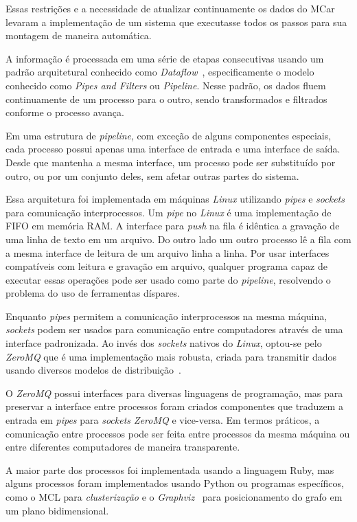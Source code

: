 \documentclass[12pt,a4paper]{article}
\begin{document}
Essas restrições e a necessidade de atualizar continuamente os dados do MCar levaram a implementação de um sistema que executasse todos os passos para sua montagem de maneira automática.

A informação é processada em uma série de etapas consecutivas usando um padrão arquitetural conhecido como \textit{Dataflow}~\cite{Carkci2014-jk, Hohpe2003-nj}, especificamente o modelo conhecido como \textit{Pipes and Filters} ou \textit{Pipeline}. Nesse padrão, os dados fluem continuamente de um processo para o outro, sendo transformados e filtrados conforme o processo avança. 

Em uma estrutura de \textit{pipeline}, com exceção de alguns componentes especiais, cada processo possui apenas uma interface de entrada e uma interface de saída. Desde que mantenha a mesma interface, um processo pode ser substituído por outro, ou por um conjunto deles, sem afetar outras partes do sistema.

Essa arquitetura foi implementada em máquinas \textit{Linux} utilizando \textit{pipes} e \textit{sockets} para comunicação interprocessos. Um \textit{pipe} no \textit{Linux} é uma implementação de FIFO em memória RAM. A interface para \textit{push} na fila é idêntica a gravação de uma linha de texto em um arquivo. Do outro lado um outro processo lê a fila com a mesma interface de leitura de um arquivo linha a linha. Por usar interfaces compatíveis com leitura e gravação em arquivo, qualquer programa capaz de executar essas operações pode ser usado como parte do \textit{pipeline}, resolvendo o problema do uso de ferramentas díspares.

Enquanto \textit{pipes} permitem a comunicação interprocessos na mesma máquina, \textit{sockets} podem ser usados para comunicação entre computadores através de uma interface padronizada. Ao invés dos \textit{sockets} nativos do \textit{Linux}, optou-se pelo \textit{ZeroMQ} que é uma implementação mais robusta, criada para transmitir dados usando diversos modelos de distribuição~\cite{Hintjens2013-tz}.

O \textit{ZeroMQ} possui interfaces para diversas linguagens de programação, mas para preservar a interface entre processos foram criados componentes que traduzem a entrada em \textit{pipes} para \textit{sockets ZeroMQ} e vice-versa. Em termos práticos, a comunicação entre processos pode ser feita entre processos da mesma máquina ou entre diferentes computadores de maneira transparente.

A maior parte dos processos foi implementada usando a linguagem Ruby, mas alguns processos foram implementados usando Python ou programas específicos, como o MCL para \textit{clusterização} e o \textit{Graphviz}~\cite{Gansner2000-oo} para posicionamento do grafo em um plano bidimensional.
\end{document}
